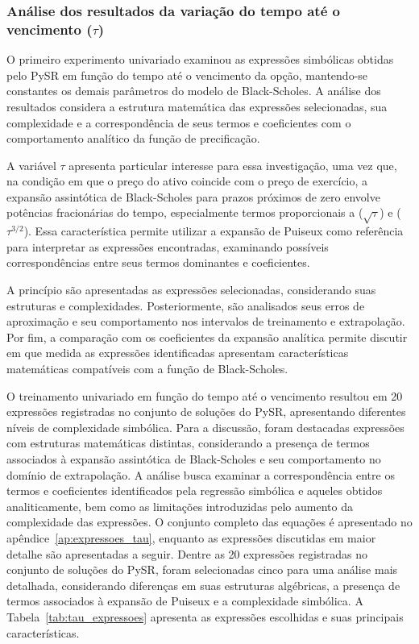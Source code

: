 \subsubsection{Análise dos resultados da variação do tempo até o vencimento ($\tau$)}
\label{subsec:resultados_tau}
O primeiro experimento univariado examinou as expressões simbólicas obtidas pelo PySR em função do tempo até o vencimento da opção, mantendo-se constantes os demais parâmetros do modelo de Black-Scholes. A análise dos resultados considera a estrutura matemática das expressões selecionadas, sua complexidade e a correspondência de seus termos e coeficientes com o comportamento analítico da função de precificação.

A variável $\tau$ apresenta particular interesse para essa investigação, uma vez que, na condição em que o preço do ativo coincide com o preço de exercício, a expansão assintótica de Black-Scholes para prazos próximos de zero envolve potências fracionárias do tempo, especialmente termos proporcionais a ($\sqrt{\tau}$) e ($\tau^{3/2}$). Essa característica permite utilizar a expansão de Puiseux como referência para interpretar as expressões encontradas, examinando possíveis correspondências entre seus termos dominantes e coeficientes.

A princípio são apresentadas as expressões selecionadas, considerando suas estruturas e complexidades. Posteriormente, são analisados seus erros de aproximação e seu comportamento nos intervalos de treinamento e extrapolação. Por fim, a comparação com os coeficientes da expansão analítica permite discutir em que medida as expressões identificadas apresentam características matemáticas compatíveis com a função de Black-Scholes.

O treinamento univariado em função do tempo até o vencimento resultou em 20 expressões registradas no conjunto de soluções do PySR, apresentando diferentes níveis de complexidade simbólica. Para a discussão, foram destacadas expressões com estruturas matemáticas distintas, considerando a presença de termos associados à expansão assintótica de Black-Scholes e seu comportamento no domínio de extrapolação. A análise busca examinar a correspondência entre os termos e coeficientes identificados pela regressão simbólica e aqueles obtidos analiticamente, bem como as limitações introduzidas pelo aumento da complexidade das expressões. O conjunto completo das equações é apresentado no apêndice~\ref{ap:expressoes_tau}, enquanto as expressões discutidas em maior detalhe são apresentadas a seguir.
Dentre as 20 expressões registradas no conjunto de soluções do PySR, foram selecionadas cinco para uma análise mais detalhada, considerando diferenças em suas estruturas algébricas, a presença de termos associados à expansão de Puiseux e a complexidade simbólica. A Tabela~\ref{tab:tau_expressoes} apresenta as expressões escolhidas e suas principais características.


